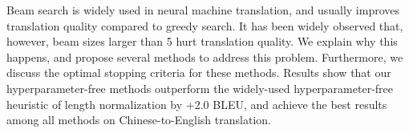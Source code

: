 Beam search is widely used in neural machine translation, and usually improves translation quality compared to greedy search. It has been widely observed that, however, beam sizes larger than 5 hurt translation quality. We explain why this happens, and propose several methods to address this problem. Furthermore, we discuss the optimal stopping criteria for these methods. Results show that our hyperparameter-free methods outperform the widely-used hyperparameter-free heuristic of length normalization by +2.0 BLEU, and achieve the best results among all methods on Chinese-to-English translation.
